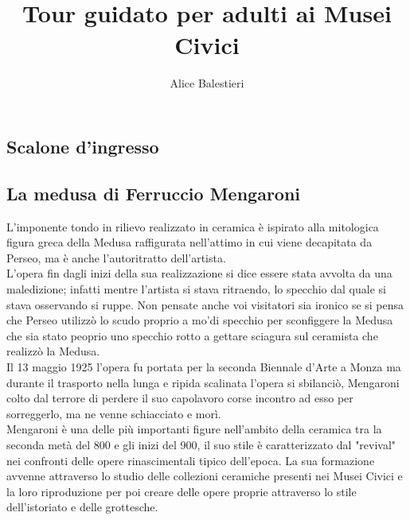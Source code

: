 \documentclass[hidelinks,12pt,a4paper]{article}
\begin{document}
	\begin{flushleft}
	
			\title{\textbf{\\Tour guidato per adulti ai Musei Civici}}
			\author{Alice Balestieri}
			\date{}
	
			\maketitle
			\setcounter{page}{1}
			\newpage
	
			\tableofcontents
			\newpage
	
			\section{Scalone d'ingresso}
	
			\subsection{La medusa di Ferruccio Mengaroni}
			L'imponente tondo in rilievo realizzato in ceramica è ispirato alla mitologica figura greca della Medusa raffigurata nell'attimo in cui viene decapitata da Perseo, ma è anche l’autoritratto dell'artista.\\
			L'opera fin dagli inizi della sua realizzazione si dice essere stata avvolta da una maledizione; infatti mentre l'artista si stava ritraendo, lo specchio dal quale si stava osservando si ruppe. Non pensate anche voi visitatori sia ironico se si pensa che Perseo utilizzò lo scudo proprio a mo'di specchio per sconfiggere la Medusa che sia stato peoprio uno specchio rotto a gettare sciagura sul ceramista che realizzò la Medusa.\\
			Il 13 maggio 1925 l'opera fu portata per la seconda Biennale d'Arte a Monza ma durante il trasporto nella lunga e ripida scalinata l'opera si sbilanciò, Mengaroni colto dal terrore di perdere il suo capolavoro corse incontro ad esso per sorreggerlo, ma ne venne schiacciato e morì.\\
			Mengaroni è una delle più importanti figure nell'ambito della ceramica tra la seconda metà del 800 e gli inizi del 900, il suo stile è caratterizzato dal "revival" nei confronti delle opere rinascimentali tipico dell'epoca. La sua formazione avvenne attraverso lo studio delle collezioni ceramiche presenti nei Musei Civici e la loro riproduzione per poi creare delle opere proprie attraverso lo stile dell'istoriato e delle grottesche.
	

\end{flushleft}
\end{document}

